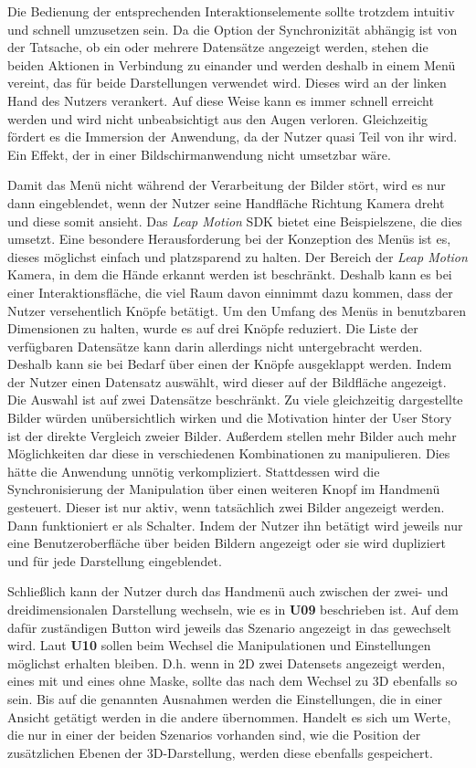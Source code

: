 Die Bedienung der entsprechenden Interaktionselemente sollte trotzdem intuitiv und schnell umzusetzen sein. Da die Option der Synchronizität abhängig ist von der Tatsache, ob ein oder mehrere Datensätze angezeigt werden, stehen die beiden Aktionen in Verbindung zu einander und werden deshalb in einem Menü vereint, das für beide Darstellungen verwendet wird. Dieses wird an der linken Hand des Nutzers verankert. Auf diese Weise kann es immer schnell erreicht werden und wird nicht unbeabsichtigt aus den Augen verloren. Gleichzeitig fördert es die Immersion der Anwendung, da der Nutzer quasi Teil von ihr wird. Ein Effekt, der in einer Bildschirmanwendung nicht umsetzbar wäre. 

Damit das Menü nicht während der Verarbeitung der Bilder stört, wird es nur dann eingeblendet, wenn der Nutzer seine Handfläche Richtung Kamera dreht und diese somit ansieht. Das \textit{Leap Motion} SDK bietet eine Beispielszene, die dies umsetzt.
Eine besondere Herausforderung bei der Konzeption des Menüs ist es, dieses möglichst einfach und platzsparend zu halten. Der Bereich der \textit{Leap Motion} Kamera, in dem die Hände erkannt werden ist beschränkt. Deshalb kann es bei einer Interaktionsfläche, die viel Raum davon einnimmt dazu kommen, dass der Nutzer versehentlich Knöpfe betätigt. 
Um den Umfang des Menüs in benutzbaren Dimensionen zu halten, wurde es auf drei Knöpfe reduziert. 
Die Liste der verfügbaren Datensätze kann darin allerdings nicht untergebracht werden. Deshalb kann sie bei Bedarf über einen der Knöpfe ausgeklappt werden. 
Indem der Nutzer einen Datensatz auswählt, wird dieser auf der Bildfläche angezeigt. Die Auswahl ist auf zwei Datensätze beschränkt. Zu viele gleichzeitig dargestellte Bilder würden unübersichtlich wirken und die Motivation hinter der User Story ist der direkte Vergleich zweier Bilder. Außerdem stellen mehr Bilder auch mehr Möglichkeiten dar diese in verschiedenen Kombinationen zu manipulieren. Dies hätte die Anwendung unnötig verkompliziert. 
Stattdessen wird die Synchronisierung der Manipulation über einen weiteren Knopf im Handmenü gesteuert. Dieser ist nur aktiv, wenn tatsächlich zwei Bilder angezeigt werden. Dann funktioniert er als Schalter. Indem der Nutzer ihn betätigt wird jeweils nur eine Benutzeroberfläche über beiden Bildern angezeigt oder sie wird dupliziert und für jede Darstellung eingeblendet. 
 
Schließlich kann der Nutzer durch das Handmenü auch zwischen der zwei- und dreidimensionalen Darstellung wechseln, wie es in \textbf{U09} beschrieben ist. Auf dem dafür zuständigen Button wird jeweils das Szenario angezeigt in das gewechselt wird.
Laut \textbf{U10} sollen beim Wechsel die Manipulationen und Einstellungen möglichst erhalten bleiben. D.h. wenn in 2D zwei Datensets angezeigt werden, eines mit und eines ohne Maske, sollte das nach dem Wechsel zu 3D ebenfalls so sein. 
Bis auf die genannten Ausnahmen werden die Einstellungen, die in einer Ansicht getätigt werden in die andere übernommen. Handelt es sich um Werte, die nur in einer der beiden Szenarios vorhanden sind, wie die Position der zusätzlichen Ebenen der 3D-Darstellung, werden diese ebenfalls gespeichert.

